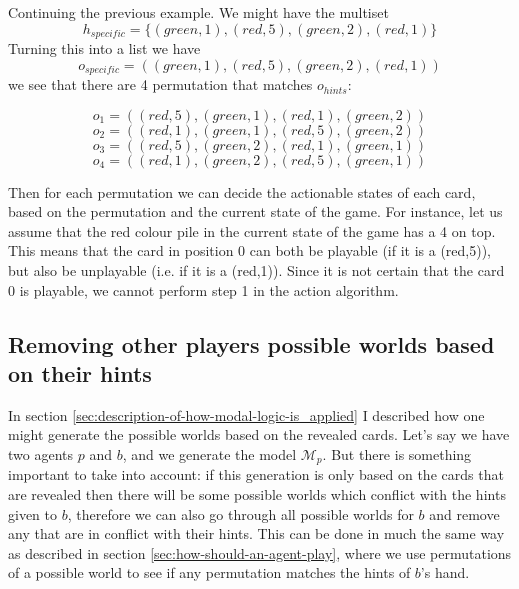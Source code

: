 Continuing the previous example.
We might have the multiset \[h_{specific} = \{(green,1),(red,5),(green,2),(red,1)\}\]
Turning this into a list we have
\[o_{specific} = ((green,1),(red,5),(green,2),(red,1))\]
we see that there are 4 permutation that matches $o_{hints}$:

\[o_{1} = ((red,5),(green,1),(red,1),(green,2))\]
\[o_{2} = ((red,1),(green,1),(red,5),(green,2))\]
\[o_{3} = ((red,5),(green,2),(red,1),(green,1))\]
\[o_{4} = ((red,1),(green,2),(red,5),(green,1))\]

Then for each permutation we can decide the actionable states of each card, based on the permutation and the current state of the game.
For instance, let us assume that the red colour pile in the current state of the game has a 4 on top.
This means that the card in position 0 can both be playable (if it is a (red,5)), but also be unplayable (i.e. if it is a (red,1)).
Since it is not certain that the card 0 is playable, we cannot perform step 1 in the action algorithm.


\subsection{Removing other players possible worlds based on their hints} \label{sec:design:removing-worlds-based-on-hints}
In section \ref{sec:description-of-how-modal-logic-is_applied} I described how one might generate the possible worlds based on the revealed cards.
Let's say we have two agents $p$ and $b$, and we generate the model $\mathcal{M}_p$.
But there is something important to take into account: if this generation is only based on the cards that are revealed then there will be some possible worlds which conflict with the hints given to $b$, therefore we can also go through all possible worlds for $b$ and remove any that are in conflict with their hints.
This can be done in much the same way as described in section \ref{sec:how-should-an-agent-play}, where we use permutations of a possible world to see if any permutation matches the hints of $b$'s hand.

